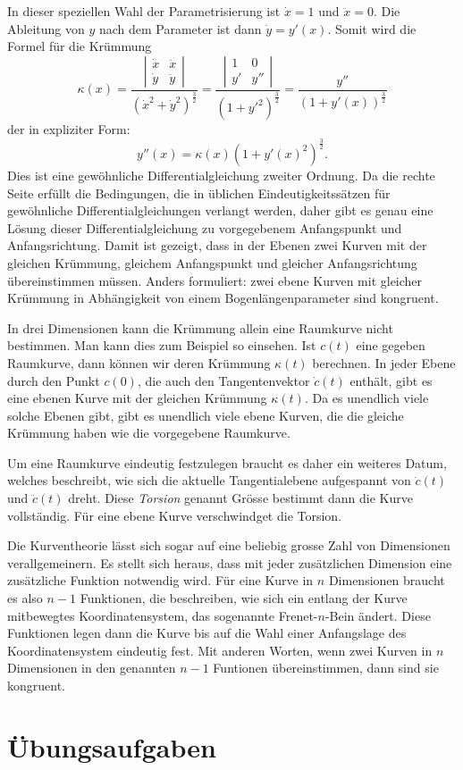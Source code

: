 In dieser speziellen Wahl der Parametrisierung ist $\dot x = 1$ und
$\ddot x=0$.
Die Ableitung von $y$ nach dem Parameter ist dann $\dot y=y'(x)$.
Somit wird die Formel für die Krümmung
\[
\kappa(x)
=
\frac{\left|\begin{matrix}\dot x&\ddot x\\\dot y&\ddot y\end{matrix}\right|}{(\dot x^2+\dot y^2)^{\frac32}}
=
\frac{\left|\begin{matrix}1&0\\y'&y''\end{matrix}\right|}{(1+y'^2)^{\frac32}}
=
\frac{y''}{(1+y'(x))^{\frac32}}
\]
der in expliziter Form:
\[
y''(x)=\kappa(x) (1+y'(x)^2)^{\frac32}.
\]
Dies ist eine gewöhnliche Differentialgleichung zweiter Ordnung.
Da die rechte Seite erfüllt die Bedingungen, die in üblichen
Eindeutigkeitssätzen für gewöhnliche Differentialgleichungen
verlangt werden, daher gibt es genau eine Lösung dieser
Differentialgleichung zu vorgegebenem Anfangspunkt und Anfangsrichtung.
Damit ist gezeigt, dass in der Ebenen zwei Kurven mit der gleichen
Krümmung, gleichem Anfangspunkt und gleicher Anfangsrichtung übereinstimmen
müssen.
Anders formuliert: zwei ebene Kurven mit gleicher Krümmung in Abhängigkeit
von einem Bogenlängenparameter sind kongruent.

In drei Dimensionen kann die Krümmung allein eine Raumkurve nicht bestimmen.
Man kann dies zum Beispiel so einsehen.
Ist $c(t)$ eine gegeben Raumkurve, dann können wir deren Krümmung
$\kappa(t)$ berechnen.
In jeder Ebene durch den Punkt $c(0)$, die auch den Tangentenvektor
$\dot c(t)$ enthält, gibt es eine ebenen Kurve mit der gleichen
Krümmung $\kappa(t)$.
Da es unendlich viele solche Ebenen gibt, gibt es unendlich viele 
ebene Kurven, die die gleiche Krümmung haben wie die vorgegebene
Raumkurve.

Um eine Raumkurve eindeutig festzulegen braucht es daher ein weiteres
Datum, welches beschreibt, wie sich die aktuelle Tangentialebene
aufgespannt von $\dot c(t)$ und $\ddot c(t)$ dreht.
Diese {\em Torsion} genannt Grösse bestimmt dann die Kurve vollständig.
Für eine ebene Kurve verschwindget die Torsion.

Die Kurventheorie lässt sich sogar auf eine beliebig grosse Zahl
von Dimensionen verallgemeinern.
Es stellt sich heraus, dass mit jeder zusätzlichen Dimension eine
zusätzliche Funktion notwendig wird.
Für eine Kurve in $n$ Dimensionen braucht es also $n-1$ Funktionen,
die beschreiben, wie sich ein entlang der Kurve mitbewegtes Koordinatensystem,
das sogenannte Frenet-$n$-Bein ändert.
Diese Funktionen legen dann die Kurve bis auf die Wahl einer Anfangslage
des Koordinatensystem eindeutig fest.
Mit anderen Worten, wenn zwei Kurven in $n$ Dimensionen in den genannten
$n-1$ Funtionen übereinstimmen, dann sind sie kongruent.




\section*{Übungsaufgaben}

